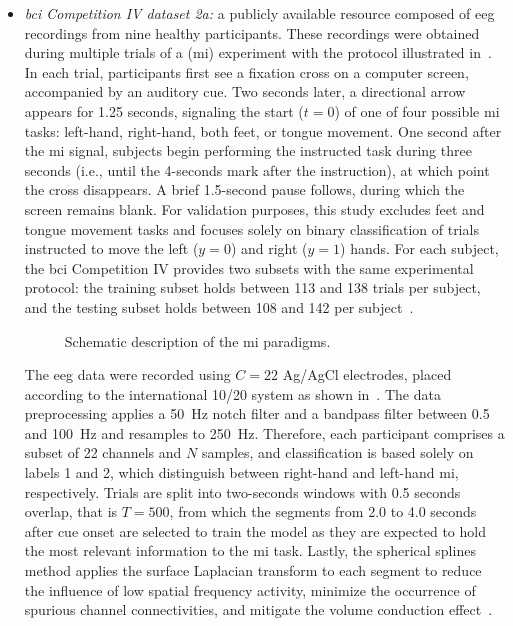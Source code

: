 \begin{itemize}
    \item[--] \textit{\gls{bci} Competition IV dataset 2a:} a publicly available resource composed of \gls{eeg} recordings from nine healthy participants. These recordings were obtained during multiple trials of a (\gls{mi}) experiment with the protocol illustrated in~. In each trial, participants first see a fixation cross on a computer screen, accompanied by an auditory cue. Two seconds later, a directional arrow appears for 1.25 seconds, signaling the start ($t=0$) of one of four possible \gls{mi} tasks: left-hand, right-hand, both feet, or tongue movement. One second after the \gls{mi} signal, subjects begin performing the instructed task during three seconds (i.e., until the 4-seconds mark after the instruction), at which point the cross disappears. A brief 1.5-second pause follows, during which the screen remains blank. For validation purposes, this study excludes feet and tongue movement tasks and focuses solely on binary classification of trials instructed to move the left ($y=0$) and right ($y=1$) hands. For each subject, the \gls{bci} Competition IV provides two subsets with the same experimental protocol: the training subset holds between 113 and 138 trials per subject, and the testing subset holds between 108 and 142 per subject~\cite{tangermann2012review}.
    
    \begin{figure}[htbp]
      \centering
      \resizebox{0.9\textwidth}{!}{}
      \caption{Schematic description of the \gls{mi} paradigms.}
      \label{fig:bci2a}
    \end{figure}

    The \gls{eeg} data were recorded using $C=22$ Ag/AgCl electrodes, placed according to the international 10/20 system as shown in~. The data preprocessing applies a 50~Hz notch filter and a bandpass filter between 0.5 and 100~Hz and resamples to 250~Hz. Therefore, each participant comprises a subset of 22 channels and $N$ samples, and classification is based solely on labels 1 and 2, which distinguish between right-hand and left-hand \gls{mi}, respectively. Trials are split into two-seconds windows with 0.5 seconds overlap, that is $T=500$, from which the segments from 2.0 to 4.0 seconds after cue onset are selected to train the model as they are expected to hold the most relevant information to the \gls{mi} task. Lastly, the spherical splines method applies the surface Laplacian transform to each segment to reduce the influence of low spatial frequency activity, minimize the occurrence of spurious channel connectivities, and mitigate the volume conduction effect~\cite{tenke2015surface, hua2024scalp,lu2012adaptive, kapralov2024sensorimotor}.


\end{itemize}
